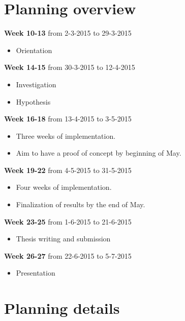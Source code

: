 \documentclass[singleside,openright]{uva-bachelor-thesis}
\newenvironment{week}[3]{
\newcommand{\topic}{\item}
\vspace{2mm} %
\noindent
\textbf{Week #1} from #2 to #3
\begin{itemize}[nolistsep]
}{
\end{itemize}
}
\begin{document}
\section{Planning overview}
\begin{week}{10-13}{2-3-2015}{29-3-2015}
\topic Orientation
\end{week}
\begin{week}{14-15}{30-3-2015}{12-4-2015}
\topic Investigation
\topic Hypothesis
\end{week}
\begin{week}{16-18}{13-4-2015}{3-5-2015}
\topic Three weeks of implementation. 
\topic Aim to have a proof of concept by beginning of May. 
\end{week}
\begin{week}{19-22}{4-5-2015}{31-5-2015}
\topic Four weeks of implementation. 
\topic Finalization of results by the end of May.
\end{week}
\begin{week}{23-25}{1-6-2015}{21-6-2015}
\topic Thesis writing and submission
\end{week}
\begin{week}{26-27}{22-6-2015}{5-7-2015}
\topic Presentation
\end{week}


\section{Planning details}
\end{document}
